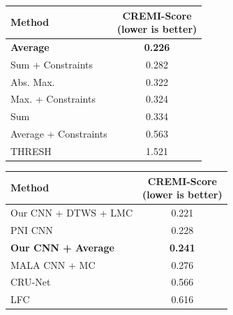 \begin{figure}[t]
        \centering
\begin{minipage}[t]{0.31\textwidth}
    \centering
    \scriptsize
        \begin{tabular}[t]{l|c}
         Method & \makecell{CREMI-Score \\(lower is better)} \\ \midrule 
\textbf{\algname{}} \textbf{Average}& \textbf{0.226}  \\
\algname{} Sum + Constraints \cite{levinkov2017comparative} & 0.282 \\
\algname{} Abs. Max. \cite{wolf2018mutex} & 0.322 \\
\algname{} Max. + Constraints & 0.324 \\
\algname{} Sum \cite{keuper2015efficient} & 0.334 \\
\algname{} Average + Constraints & 0.563 \\
THRESH & 1.521 \\ 
        \end{tabular}
    \label{tab:results_cremi_train}
\end{minipage}\hfill
\begin{minipage}[t]{0.3\textwidth}
    \centering
    \scriptsize
        \begin{tabular}[t]{l|c}
        Method & \makecell{CREMI-Score \\(lower is better)}  \\ \midrule
Our CNN + DTWS + LMC &  0.221\\
PNI CNN \cite{lee2017superhuman} & 0.228 \\
\textbf{Our CNN + \algname{} Average} & \textbf{0.241} \\
MALA CNN + MC \cite{funke2018large} & 0.276 \\
CRU-Net \cite{zeng2017deepem3d} & 0.566  \\
LFC \cite{parag2017anisotropic} & 0.616  \\
        \end{tabular}
        \vspace*{0.99em}
    \label{tab:results_cremi_test}

\end{minipage}
\end{figure}
